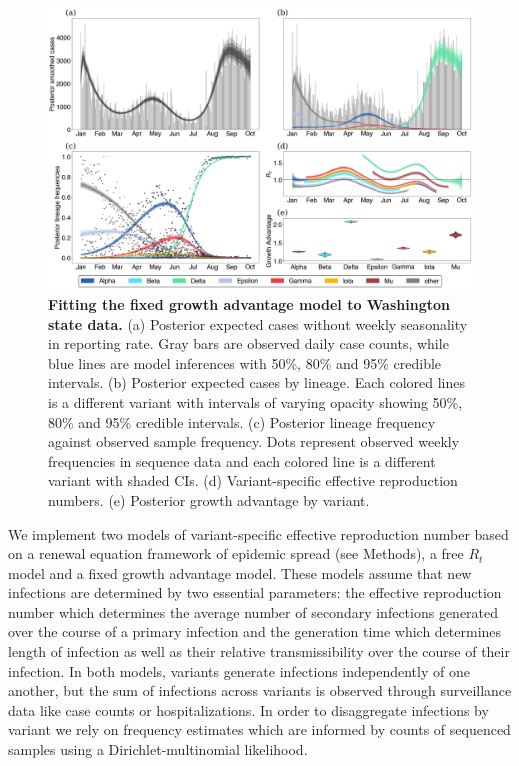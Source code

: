 \documentclass[11pt,oneside,letterpaper]{article}
\begin{document}
\begin{figure}[h!]
  \centering
  \includegraphics[width=\linewidth]{figs/fixed_growth_Washington.png}
  \caption{\textbf{Fitting the fixed growth advantage model to Washington state data.}
  (a) Posterior expected cases without weekly seasonality in reporting rate.
  Gray bars are observed daily case counts, while blue lines are model inferences with 50\%, 80\% and 95\% credible intervals.
  (b) Posterior expected cases by lineage.
  Each colored lines is a different variant with intervals of varying opacity showing 50\%, 80\% and 95\% credible intervals.
  (c) Posterior lineage frequency against observed sample frequency.
  Dots represent observed weekly frequencies in sequence data and each colored line is a different variant with shaded CIs.
  (d) Variant-specific effective reproduction numbers.
  (e) Posterior growth advantage by variant.}
  \label{fig:fixed_growth_Washington}
\end{figure}

We implement two models of variant-specific effective reproduction number based on a renewal equation framework of epidemic spread (see Methods), a free $R_{t}$ model and a fixed growth advantage model.
These models assume that new infections are determined by two essential parameters: the effective reproduction number which determines the average number of secondary infections generated over the course of a primary infection and the generation time which determines length of infection as well as their relative transmissibility over the course of their infection.
In both models, variants generate infections independently of one another, but the sum of infections across variants is observed through surveillance data like case counts or hospitalizations.
In order to disaggregate infections by variant we rely on frequency estimates which are informed by counts of sequenced samples using a Dirichlet-multinomial likelihood.
\end{document}
